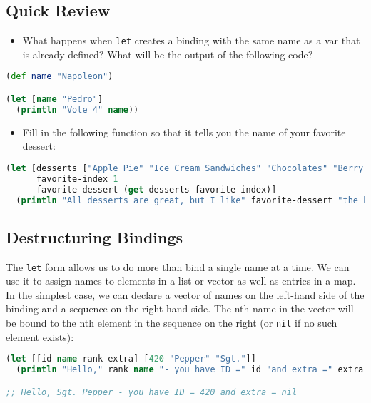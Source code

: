 \documentclass[10pt,twoside,openright]{memoir}
\begin{document}
\subsection{Quick Review}

\begin{itemize}
\tightlist
\item
  What happens when \texttt{let} creates a binding with the same name as
  a var that is already defined? What will be the output of the
  following code?
\end{itemize}

\begin{lstlisting}[language=Clojure]
(def name "Napoleon")

(let [name "Pedro"]
  (println "Vote 4" name))
\end{lstlisting}

\begin{itemize}
\tightlist
\item
  Fill in the following function so that it tells you the name of your
  favorite dessert:
\end{itemize}

\begin{lstlisting}[language=Clojure]
(let [desserts ["Apple Pie" "Ice Cream Sandwiches" "Chocolates" "Berry Buckle"]
      favorite-index 1
      favorite-dessert (get desserts favorite-index)]
  (println "All desserts are great, but I like" favorite-dessert "the best"))
\end{lstlisting}

\subsection{Destructuring Bindings}

The \texttt{let} form allows us to do more than bind a single name at a
time. We can use it to assign names to elements in a list or vector as
well as entries in a map. In the simplest case, we can declare a vector
of names on the left-hand side of the binding and a sequence on the
right-hand side. The nth name in the vector will be bound to the nth
element in the sequence on the right (or \texttt{nil} if no such element
exists):

\begin{lstlisting}[language=Clojure, caption={Vector bindings}]
(let [[id name rank extra] [420 "Pepper" "Sgt."]]
  (println "Hello," rank name "- you have ID =" id "and extra =" extra))

;; Hello, Sgt. Pepper - you have ID = 420 and extra = nil
\end{lstlisting}
\end{document}

